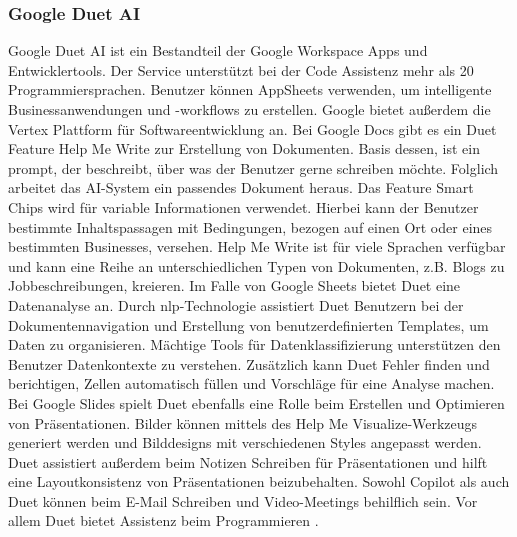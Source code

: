\subsubsection{Google Duet AI}
Google Duet AI ist ein Bestandteil der Google Workspace Apps und Entwicklertools. Der Service unterstützt bei der Code Assistenz mehr als 20 Programmiersprachen. Benutzer können AppSheets verwenden, um intelligente Businessanwendungen und -workflows zu erstellen. Google bietet außerdem die Vertex Plattform für Softwareentwicklung an. Bei Google Docs gibt es ein Duet Feature Help Me Write zur Erstellung von Dokumenten. Basis dessen, ist ein prompt, der beschreibt, über was der Benutzer gerne schreiben möchte. Folglich arbeitet das AI-System ein passendes Dokument heraus. Das Feature Smart Chips wird für variable Informationen verwendet. Hierbei kann der Benutzer bestimmte Inhaltspassagen mit Bedingungen, bezogen auf einen Ort oder eines bestimmten Businesses, versehen. Help Me Write ist für viele Sprachen verfügbar und kann eine Reihe an unterschiedlichen Typen von Dokumenten, z.B. Blogs zu Jobbeschreibungen, kreieren. Im Falle von Google Sheets bietet Duet eine Datenanalyse an. Durch \gls{nlp}-Technologie assistiert Duet Benutzern bei der Dokumentennavigation und Erstellung von benutzerdefinierten Templates, um Daten zu organisieren. Mächtige Tools für Datenklassifizierung unterstützen den Benutzer Datenkontexte zu verstehen. Zusätzlich kann Duet Fehler finden und berichtigen, Zellen automatisch füllen und Vorschläge für eine Analyse machen. Bei Google Slides spielt Duet ebenfalls eine Rolle beim Erstellen und Optimieren von Präsentationen. Bilder können mittels des Help Me Visualize-Werkzeugs generiert werden und Bilddesigns mit verschiedenen Styles angepasst werden. Duet assistiert außerdem beim Notizen Schreiben für Präsentationen und hilft eine Layoutkonsistenz von Präsentationen beizubehalten. Sowohl Copilot als auch Duet können beim E-Mail Schreiben und Video-Meetings behilflich sein. Vor allem Duet bietet Assistenz beim Programmieren \cite{copilot-duet}.

